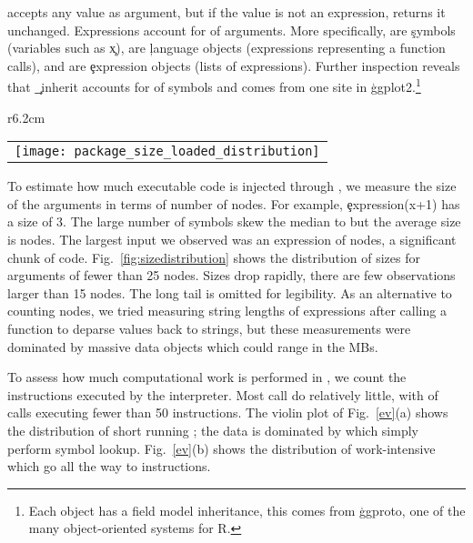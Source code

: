 \documentclass[screen,acmsmall]{acmart}%
\begin{document}
\Eval accepts any value as argument, but if the value is not an expression,
\eval returns it unchanged. Expressions account for \packageCodepercent of
arguments. More specifically, \packageSymbolpercent are \c{symbol}s (variables
such as \c{x}), \packageLanguagepercent are \c{language} objects (expressions
representing a function calls), and \packageExpressionpercent are \c{expression}
objects (lists of expressions). Further inspection reveals that \c{\_inherit}
accounts for \packageGgplotsymbolpercent of symbols and comes from one site in
\c{ggplot2}.\footnote{Each object has a field model inheritance, this comes from
\c{ggproto}, one of the many object-oriented systems for R.}


\begin{wrapfigure}{r}{6.2cm}
\begin{tabular}{c}
{\hspace{-25mm}\texttt{[image: package\_size\_loaded\_distribution]}}
\end{tabular}
\caption{Loaded code} \label{fig:sizedistribution}
\end{wrapfigure}

To estimate how much executable code is injected through \eval, we measure the
size of the arguments in terms of number of nodes. For example,
\c{expression(x+1)} has a size of 3. The large number of symbols skew the median
to \packageMedianszeval but the average size is \packageAvgszeval nodes. The
largest \eval input we observed was an expression of \packageMaxszeval nodes, a
significant chunk of code. Fig.~\ref{fig:sizedistribution} shows the
distribution of sizes for arguments of fewer than 25 nodes. Sizes drop rapidly,
there are few observations larger than 15 nodes. The long tail is omitted for
legibility. As an alternative to counting nodes, we tried measuring string
lengths of expressions after calling a function to deparse values back to
strings, but these measurements were dominated by massive data objects which
could range in the MBs.

To assess how much computational work is performed in \evals, we count the
instructions executed by the interpreter. Most call do relatively little, with
\packageSmalleventspct of calls executing fewer than 50 instructions. The violin
plot of Fig.~\ref{ev}(a) shows the distribution of short running \evals; the
data is dominated by \evals which simply perform symbol lookup. Fig.~\ref{ev}(b)
shows the distribution of work-intensive \evals which go all the way to
\packageMaxeventsRnd instructions.
\end{document}
